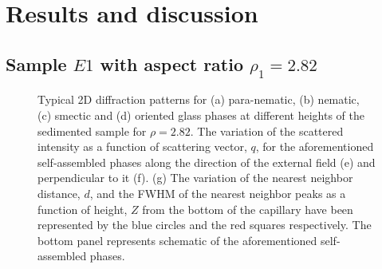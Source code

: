 \documentclass[aps,prl,preprint,superscriptaddress]{revtex4-1} %
\begin{document}
\section{Results and discussion}
\subsection{Sample $E1$ with aspect ratio $\rho_1 = 2.82$}
\begin{figure}[t]
\caption{Typical 2D diffraction patterns for (a) para-nematic, (b) nematic, (c) smectic and (d) oriented glass phases at different heights of the sedimented sample for $\rho=2.82$. The variation of the scattered intensity as a function of scattering vector, $q$, for the aforementioned self-assembled phases along the direction of the external field (e) and perpendicular to it (f). (g) The variation of the nearest neighbor distance, $d$, and the FWHM of the nearest neighbor peaks as a function of height, $Z$ from the bottom of the capillary have been represented by the blue circles and the red squares respectively. The bottom panel represents schematic of the aforementioned self-assembled phases.}\label{z_scan}
\end{figure} 
\end{document}
